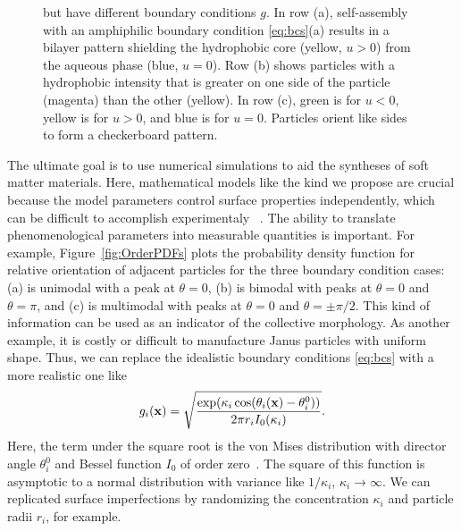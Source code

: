 \begin{figure}[h!]
{    but have different boundary conditions $g.$ 
    In row (a), self-assembly with an amphiphilic boundary
    condition \eqref{eq:bcs}(a) results in a bilayer pattern shielding
    the hydrophobic core (yellow, $u > 0$) from the aqueous phase (blue, $u = 0$).
    Row (b) shows particles with a hydrophobic intensity that is
    greater on one side of the particle (magenta) than the other (yellow).
    In row (c), green is for $u < 0$, yellow is for $u > 0$, and blue is for $u = 0$.
    Particles orient like sides to form a checkerboard pattern.\\
  }
\end{figure}

The ultimate goal is to use numerical simulations to aid
the syntheses of soft matter materials.
Here, mathematical models like the kind we propose are crucial
because the model parameters control surface properties independently, 
which can be difficult to accomplish experimentaly 
~\cite{Bradley2016,Mallory2017,Bradley2017}.
The ability to translate phenomenological parameters
into measurable quantities is important. 
For example, Figure~\ref{fig:OrderPDFs} plots
the probability density function for 
relative orientation of adjacent particles
for the three boundary condition cases:
(a) is unimodal with a peak at $\theta = 0$,
(b) is bimodal with peaks at $\theta = 0$ and $\theta = \pi$,
and (c) is multimodal with peaks at $\theta = 0$ and $\theta = \pm \pi/2$.
This kind of information can be used as an indicator
of the collective morphology. As another example,
it is costly or difficult to manufacture
Janus particles with uniform shape.
Thus, we can replace the idealistic boundary
conditions \eqref{eq:bcs} with a more realistic one like
\begin{equation}
\label{eq:vonMises}
  g_i(\mathbf{x}) = \sqrt{
  \frac{\exp( \kappa_i\cos(\theta_i(\mathbf{x}) - \theta^0_i))}
  {2\pi r_i I_0(\kappa_i)}}.
\end{equation}
Here, the term under the square root is the von Mises distribution with
director angle $\theta^0_i$ and Bessel function $I_0$ of order zero~\cite{Fisher_1993}.
The square of this function is asymptotic to a normal distribution with variance
like $1/\kappa_i$, $\kappa_i \to \infty$. We can replicated surface imperfections
by randomizing the concentration $\kappa_i$ and particle radii $r_i$,
for example.





